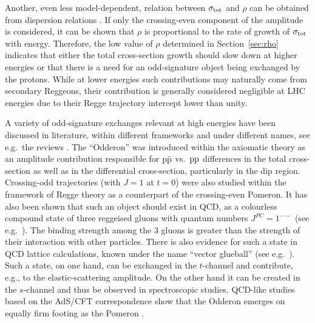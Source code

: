 Another, even less model-dependent, relation between $\sigma_{\rm tot}$ and $\rho$ can be obtained from dispersion relations \cite{dremin-dispersion,barone-predazzi}. If only the crossing-even component of the amplitude is considered, it can be shown that $\rho$ is proportional to the rate of growth of $\sigma_{\rm tot}$ with energy. Therefore, the low value of $\rho$ determined in Section~\ref{sec:rho} indicates that either the total cross-section growth should slow down at higher energies or that there is a need for an odd-signature object being exchanged by the protons. While at lower energies such contributions may naturally come from secondary Reggeons, their contribution is generally considered negligible at LHC energies due to their Regge trajectory intercept lower than unity.

A variety of odd-signature exchanges relevant at high energies have been discussed in literature, within different frameworks and under different names, see e.g.~the reviews \cite{braun,ewerz}. The ``Odderon'' was introduced within the axiomatic theory \cite{nicolescu-1973,nicolescu-1992,nicolescu-2007} as an amplitude contribution responsible for $\rm p\bar p$ vs.~$\rm pp$ differences in the total cross-section as well as in the differential cross-section, particularly in the dip region. Crossing-odd trajectories (with $J=1$ at $t=0$) were also studied within the framework of Regge theory as a counterpart of the crossing-even Pomeron. It has also been shown that such an object should exist in QCD, as a colourless compound state of three reggeised gluons with quantum numbers $J^{PC} = 1^{--}$ (see e.g.~\cite{bartels-2000}). The binding strength among the 3 gluons is greater than the strength of their interaction with other particles. There is also evidence for such a state in QCD lattice calculations, known under the name ``vector glueball'' (see e.g.~\cite{morningstar-1999}). Such a state, on one hand, can be exchanged in the $t$-channel and contribute, e.g., to the elastic-scattering amplitude. On the other hand it can be created in the $s$-channel and thus be observed in spectroscopic studies. QCD-like studies based on the AdS/CFT correspondence show that the Odderon emerges on equally firm footing as the Pomeron \cite{brower-2009}.

